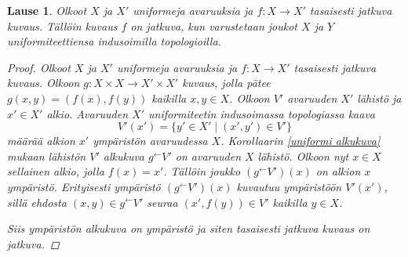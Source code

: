 \documentclass[12pt,a4paper,leqno]{report}
\theoremstyle{plain}
\newtheorem{lause}[equation]{Lause}
\theoremstyle{definition}
\theoremstyle{remark}
\begin{document}
\begin{lause}
Olkoot $X$ ja $X'$ uniformeja avaruuksia 
ja $f\colon X\rightarrow X'$ tasaisesti jatkuva kuvaus. 
Tällöin kuvaus $f$ on jatkuva, %
kun varustetaan joukot $X$ ja $Y$ uniformiteettiensa indusoimilla topologioilla.
\begin{proof}
Olkoot $X$ ja $X'$ uniformeja avaruuksia 
ja $f\colon X\rightarrow X'$ tasaisesti jatkuva kuvaus. 
Olkoon $g\colon X\times X\rightarrow X'\times X'$ %
kuvaus, jolla pätee $g(x,y)=(f(x),f(y))$ kaikilla $x,y\in X$. 
Olkoon $V'$ avaruuden $X'$ lähistö ja $x'\in X'$ alkio. 
Avaruuden $X'$ uniformiteetin indusoimassa topologiassa kaava 
$$V'(x')=\{ y'\in X'\mid (x',y')\in V'\}$$
määrää alkion $x'$ ympäristön avaruudessa $X$.
Korollaarin \ref{uniformi alkukuva} mukaan lähistön $V'$ alkukuva $g^{\leftarrow}V'$ on avaruuden $X$ lähistö.
Olkoon nyt $x\in X$ sellainen alkio, jolla $f(x)=x'$.
Tällöin joukko $(g^{\leftarrow}V')(x)$ on alkion $x$ ympäristö. 
Erityisesti ympäristö $(g^{\leftarrow}V')(x)$ kuvautuu ympäristöön $V'(x')$, 
sillä ehdosta $(x,y)\in g^\leftarrow V'$ seuraa $(x',f(y))\in V' $ kaikilla $y\in X$.
%
%

Siis ympäristön alkukuva on ympäristö ja siten tasaisesti jatkuva kuvaus on jatkuva.
\end{proof}
\end{lause}
\end{document}
